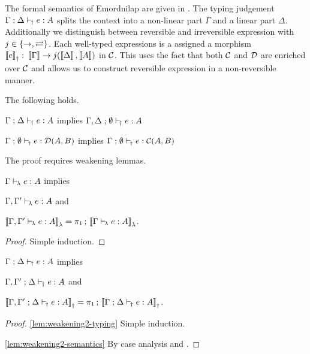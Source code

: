 \documentclass[runningheads,envcountsame]{llncs}
\begin{document}
    The formal semantics of Emordnilap are given in . The typing judgement $\typeruled{\Gamma}{\Delta}{e}{j}{A}$ splits the context into a non-linear part $\Gamma$ and a linear part $\Delta$. Additionally we distinguish between reversible and irreversible expression with $j \in \{ \fun, \js \}$. Each well-typed expressions is a assigned a morphism $\semD{e}\colon \sem{\Gamma} \to \homJ{\sem{\Delta}}{j}{\sem{A}}$ in $\C$. This uses the fact that both $\C$ and $\D$ are enriched over $\C$ and allows us to construct reversible expression in a non-reversible manner. 
    
    \begin{lemma} \label{lem:js-implies-fun-typing} The following holds.
        \begin{lemmalist}
            \item $\typeruled{\Gamma}{\Delta}{e}{\js}{A}$ implies $\typeruled{\Gamma, \Delta}{\emptyset}{e}{\fun}{A}$ \label{lem:js-implies-fun-typing1}
            \item $\typeruled{\Gamma}{\emptyset}{e}{\fun}{\homD{A}{B}}$ implies $\typeruled{\Gamma}{\emptyset}{e}{\fun}{\homC{A}{B}}$ \label{lem:js-implies-fun-typing2}
        \end{lemmalist}
    \end{lemma}
    The proof requires weakening lemmas.
    
    \begin{lemma} \label{lem:weakening1}
        $\typerulel{\Gamma}{e}{A}$ implies 
        \begin{lemmalist}
        \item $\typerulel{\Gamma, \Gamma'}{e}{A}$ and \label{lem:weakening1-typing}
        \item $\semL{\typerulel{\Gamma,\Gamma'}{e}{A}} = \comp{\pi_1}{\semL{\typerulel{\Gamma}{e}{A}}}$. \label{lem:weakening1-semantics}
        \end{lemmalist}
    \end{lemma}
    \begin{proof}
        Simple induction.
    \end{proof}

    \begin{lemma}\label{lem:weakening2}
        $\typeruled{\Gamma}{\Delta}{e}{j}{A}$ implies 
        \begin{lemmalist}
        \item $\typeruled{\Gamma, \Gamma'}{\Delta}{e}{j}{A}$ and \label{lem:weakening2-typing}
        \item $\semD{\typeruled{\Gamma,\Gamma'}{\Delta}{e}{j}{A}} = \comp{\pi_1}{\semD{\typeruled{\Gamma}{\Delta}{e}{j}{A}}}$. \label{lem:weakening2-semantics}
        \end{lemmalist}
    \end{lemma}
    \begin{proof}
        \ref{lem:weakening2-typing} Simple induction.
        
        \ref{lem:weakening2-semantics} By case analysis and . 
    \end{proof}
    
\end{document}
